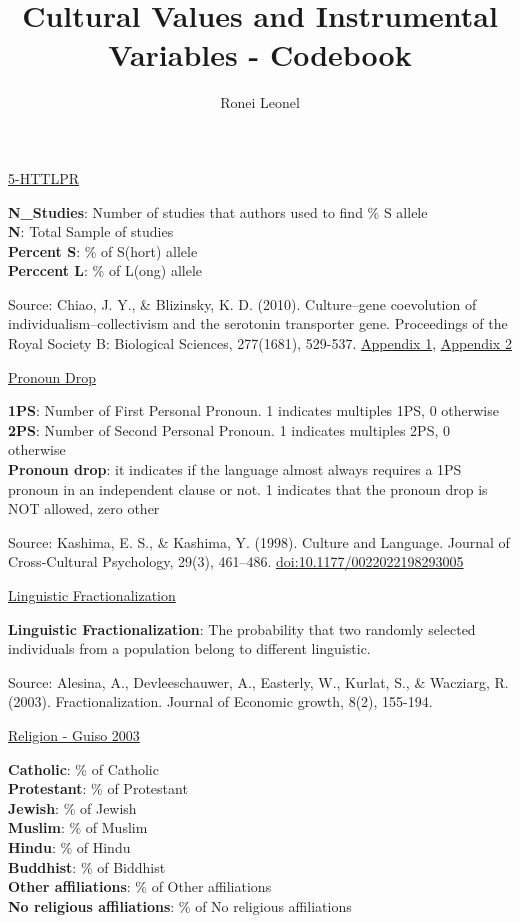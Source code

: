 \documentclass[]{article}
\title{Cultural Values and Instrumental Variables - Codebook}
\author{Ronei Leonel}
\date{}
\begin{document}
\maketitle

{
\setcounter{tocdepth}{4}
\tableofcontents
}
\protect\hyperlink{5HTTLPR}{5-HTTLPR}

\textbf{N\_Studies}: Number of studies that authors used to find \% S
allele\\
\textbf{N}: Total Sample of studies\\
\textbf{Percent S}: \% of S(hort) allele\\
\textbf{Perccent L}: \% of L(ong) allele

Source: Chiao, J. Y., \& Blizinsky, K. D. (2010). Culture--gene
coevolution of individualism--collectivism and the serotonin transporter
gene. Proceedings of the Royal Society B: Biological Sciences,
277(1681), 529-537.
\href{https://royalsocietypublishing.org/action/downloadSupplement?doi=10.1098\%2Frspb.2009.1650\&file=rspb20091650supp4.pdf}{Appendix
1},
\href{https://royalsocietypublishing.org/action/downloadSupplement?doi=10.1098\%2Frspb.2009.1650\&file=rspb20091650supp1.doc}{Appendix
2}

\protect\hyperlink{language1}{Pronoun Drop}

\textbf{1PS}: Number of First Personal Pronoun. 1 indicates multiples
1PS, 0 otherwise\\
\textbf{2PS}: Number of Second Personal Pronoun. 1 indicates multiples
2PS, 0 otherwise\\
\textbf{Pronoun drop}: it indicates if the language almost always
requires a 1PS pronoun in an independent clause or not. 1 indicates that
the pronoun drop is NOT allowed, zero other

Source: Kashima, E. S., \& Kashima, Y. (1998). Culture and Language.
Journal of Cross-Cultural Psychology, 29(3), 461--486.
\url{doi:10.1177/0022022198293005}

\protect\hyperlink{language2}{Linguistic Fractionalization}

\textbf{Linguistic Fractionalization}: The probability that two randomly
selected individuals from a population belong to different linguistic.

Source: Alesina, A., Devleeschauwer, A., Easterly, W., Kurlat, S., \&
Wacziarg, R. (2003). Fractionalization. Journal of Economic growth,
8(2), 155-194.

\protect\hyperlink{Religion1}{Religion - Guiso 2003}

\textbf{Catholic}: \% of Catholic\\
\textbf{Protestant}: \% of Protestant\\
\textbf{Jewish}: \% of Jewish\\
\textbf{Muslim}: \% of Muslim\\
\textbf{Hindu}: \% of Hindu\\
\textbf{Buddhist}: \% of Biddhist\\
\textbf{Other affiliations}: \% of Other affiliations\\
\textbf{No religious affiliations}: \% of No religious affiliations
\end{document}
